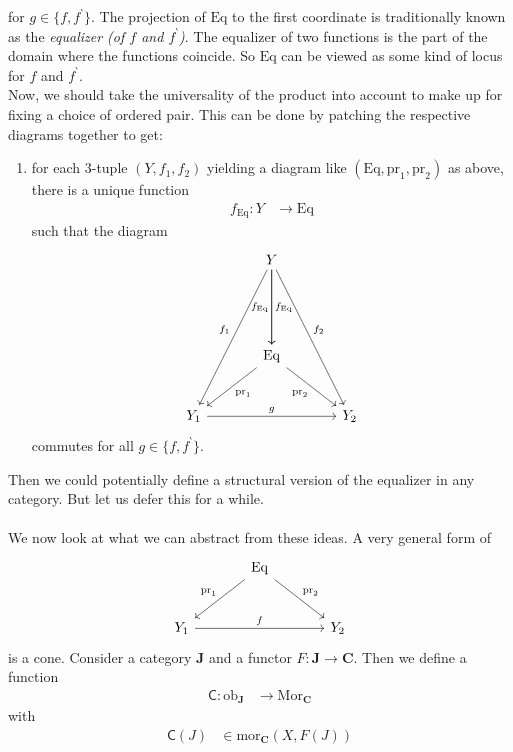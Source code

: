 for $g \in \lbrace f,f^{\backprime} \rbrace$.
The projection of $\mathrm{Eq}$ to the first coordinate is traditionally known as the \textit{equalizer (of $f$ and $f^{\backprime}$)}.
The equalizer of two functions is the part of the domain where the functions coincide.
So $\mathrm{Eq}$ can be viewed as some kind of locus for $f$ and $f^{\backprime}$.
\\
Now, we should take the universality of the product into account to make up for fixing a choice of ordered pair.
This can be done by patching the respective diagrams together to get:
\begin{enumerate}
\item[(Eq)]
for each $3$-tuple $(Y,f_{1},f_{2})$ yielding a diagram like $(\mathrm{Eq},\mathrm{pr}_{1},\mathrm{pr}_{2})$ as above, there is a unique function
\begin{align*}
  f_{\mathrm{Eq}}
  \colon
  Y
  &\rightarrow
  \mathrm{Eq}
\end{align*}
such that the diagram
\[
\begin{tikzcd}[sep=large]
  &
  Y
  \arrow{dddr}{f_{2}}
  \arrow{dd}{f_{\mathrm{Eq}}}
  \arrow[swap]{dd}{f_{\mathrm{Eq}}}
  \arrow[swap]{dddl}{f_{1}}
  &
  \\
  &
  &
  \\
  &
  \mathrm{Eq}
  \arrow[swap]{dr}{\mathrm{pr}_{2}}
  \arrow{dl}{\mathrm{pr}_{1}}
  &
  \\
  Y_{1}
  \arrow{rr}{g}
  &
  &
  Y_{2}
\end{tikzcd}
\]
commutes for all $g \in \lbrace f,f^{\backprime} \rbrace$.
\end{enumerate}
Then we could potentially define a structural version of the equalizer in any category.
But let us defer this for a while.
\\\\
We now look at what we can abstract from these ideas.
A very general form of
\[
\begin{tikzcd}[sep=large]
  &
  \mathrm{Eq}
  \arrow{dr}{\mathrm{pr}_{2}}
  \arrow[swap]{dl}{\mathrm{pr}_{1}}
  &
  \\
  Y_{1}
  \arrow{rr}{f}
  &
  &
  Y_{2}
\end{tikzcd}
\]
is a cone.
Consider a category $\mathbf{J}$ and a functor $F \colon \mathbf{J} \rightarrow \mathbf{C}$.
Then we define a function
\begin{align*}
  \mathsf{C}
  \colon
  \mathrm{ob}_{\mathbf{J}}
  &\rightarrow
  \mathrm{Mor}_{\mathbf{C}}
\end{align*}
with
\begin{align*}
  \mathsf{C}(J)
  &\in
  \mathrm{mor}_{\mathbf{C}}(X,F(J))
\end{align*}

